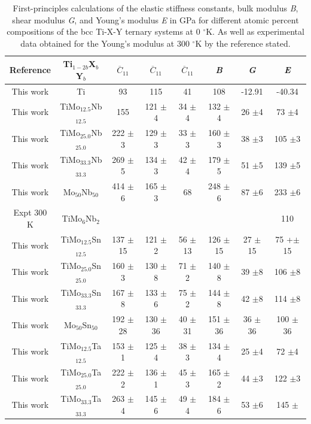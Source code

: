 \newpage
\begin{longtable}[H]{ c c c c c c c c}
	\caption{First-principles calculations of the elastic stiffness constants, bulk modulus \textit{B}, shear modulus \textit{G}, and Young's modulus \textit{E} in GPa for different atomic percent compositions of the bcc Ti-X-Y ternary systems at 0 $^\circ$K. As well as experimental data obtained for the Young's modulus at 300 $^\circ$K by the reference stated.} 	\label{Ch6-table:tixyelasdata} \\
	\hline
	Reference & Ti$_{1-2b}$X$_b$Y$_b$ & $\overline{C}_{11}$ & $\overline{C}_{11}$ & $\overline{C}_{11}$ & \textit{B} & \textit{G} & \textit{E}\\
	\hline
	\endhead
	\hline
	\endfoot
	This work & Ti & 93 & 115 & 41 & 108 & -12.91 & -40.34\\
	This work & TiMo$_{12.5}$Nb$_{12.5}$ & 155 & 121 $\pm$4 & 34 $\pm$4 & 132 $\pm$4 & 26 $\pm$4 & 73 $\pm$4\\
	This work & TiMo$_{25.0}$Nb$_{25.0}$ & 222 $\pm$3 & 129 $\pm$3 & 33 $\pm$3 & 160 $\pm$3 & 38 $\pm$3 & 105 $\pm$3\\
	This work & TiMo$_{33.3}$Nb$_{33.3}$ & 269 $\pm$5 & 134 $\pm$3 & 42 $\pm$4 & 179 $\pm$5 & 51 $\pm$5 & 139 $\pm$5\\
	This work & Mo$_{50}$Nb$_{50}$ & 414 $\pm$6 & 165 $\pm$3 & 68 & 248 $\pm$6 & 87 $\pm$6 & 233 $\pm$6\\
	Expt 300 K \cite{Niinomi2012} & TiMo$_{6}$Nb$_{2}$ & & & & & & 110\\
	This work & TiMo$_{12.5}$Sn$_{12.5}$ & 137 $\pm$15 & 121 $\pm$2 & 56 $\pm$13 & 126 $\pm$15 & 27 $\pm$15 & 75 +$\pm$15\\
	This work & TiMo$_{25.0}$Sn$_{25.0}$ & 160 $\pm$3 & 130 $\pm$8 & 71 $\pm$2 & 140 $\pm$8 & 39 $\pm$8 & 106 $\pm$8\\
	This work & TiMo$_{33.3}$Sn$_{33.3}$ & 167 $\pm$8 & 133 $\pm$6 & 75 $\pm$2 & 144 $\pm$8 & 42 $\pm$8 & 114 $\pm$8\\
	This work & Mo$_{50}$Sn$_{50}$ & 192 $\pm$28 & 130 $\pm$36 & 40 $\pm$31 & 151 $\pm$36 & 36 $\pm$36 & 100 $\pm$36\\
	This work & TiMo$_{12.5}$Ta$_{12.5}$ & 153 $\pm$1 & 125 $\pm$4 & 38 $\pm$3 & 134 $\pm$4 & 25 $\pm$4 & 72 $\pm$4\\
	This work & TiMo$_{25.0}$Ta$_{25.0}$ & 222 $\pm$2 & 136 $\pm$1 & 45 $\pm$3 & 165 $\pm$2 & 44 $\pm$3 & 122 $\pm$3\\
	This work & TiMo$_{33.3}$Ta$_{33.3}$ & 263 $\pm$4 & 145 $\pm$6 & 49 $\pm$4 & 184 $\pm$6 & 53 $\pm$6 & 145 $\pm$\\

\end{longtable}
